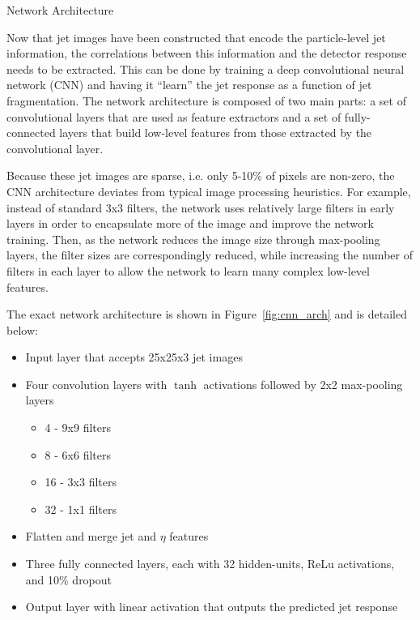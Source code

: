 \begin{section}{Network Architecture}
\label{sec:network_arch}

Now that jet images have been constructed that encode the particle-level jet information, the correlations between this information and the detector response needs to be extracted.
This can be done by training a deep convolutional neural network (CNN) and having it ``learn'' the jet response as a function of jet fragmentation.
The network architecture is composed of two main parts: a set of convolutional layers that are used as feature extractors and a set of fully-connected layers that build low-level features from those extracted by the convolutional layer.

Because these jet images are sparse, i.e. only 5-10\% of pixels are non-zero, the CNN architecture deviates from typical image processing heuristics.
For example, instead of standard 3x3 filters, the network uses relatively large filters in early layers in order to encapsulate more of the image and improve the network training.
Then, as the network reduces the image size through max-pooling layers, the filter sizes are correspondingly reduced, while increasing the number of filters in each layer to allow the network to learn many complex low-level features.

The exact network architecture is shown in Figure~\ref{fig:cnn_arch} and is detailed below:
\begin{itemize}
\item Input layer that accepts 25x25x3 jet images
\item Four convolution layers with $\tanh$ activations followed by 2x2 max-pooling layers
  \begin{itemize}
  \item 4 - 9x9 filters
  \item 8 - 6x6 filters
  \item 16 - 3x3 filters
  \item 32 - 1x1 filters
  \end{itemize}
\item Flatten and merge jet \pT and $\eta$ features
\item Three fully connected layers, each with 32 hidden-units, ReLu activations, and 10\% dropout
\item Output layer with linear activation that outputs the predicted jet response
\end{itemize}


\end{section}
